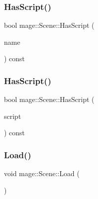 \hypertarget{classmage_1_1_scene_ad87f96d612fa5087ad3ddcbb73ef05a4}{}\label{classmage_1_1_scene_ad87f96d612fa5087ad3ddcbb73ef05a4} 
\subsubsection{\texorpdfstring{Has\+Script()}{HasScript()}\hspace{0.1cm}{\footnotesize\ttfamily [1/2]}}
{\footnotesize\ttfamily bool mage\+::\+Scene\+::\+Has\+Script (\begin{DoxyParamCaption}\item[{const string \&}]{name }\end{DoxyParamCaption}) const}

\hypertarget{classmage_1_1_scene_a31469e19b181d0cb08bf10c554d28a6d}{}\label{classmage_1_1_scene_a31469e19b181d0cb08bf10c554d28a6d} 
\subsubsection{\texorpdfstring{Has\+Script()}{HasScript()}\hspace{0.1cm}{\footnotesize\ttfamily [2/2]}}
{\footnotesize\ttfamily bool mage\+::\+Scene\+::\+Has\+Script (\begin{DoxyParamCaption}\item[{const \hyperlink{namespacemage_a1e01ae66713838a7a67d30e44c67703e}{Shared\+Ptr}$<$ \hyperlink{classmage_1_1_behavior_script}{Behavior\+Script} $>$}]{script }\end{DoxyParamCaption}) const}

\hypertarget{classmage_1_1_scene_a472443b059c8be0fcd223f6df8378934}{}\label{classmage_1_1_scene_a472443b059c8be0fcd223f6df8378934} 
\subsubsection{\texorpdfstring{Load()}{Load()}}
{\footnotesize\ttfamily void mage\+::\+Scene\+::\+Load (\begin{DoxyParamCaption}{ }\end{DoxyParamCaption})\hspace{0.3cm}{\ttfamily [virtual]}}

